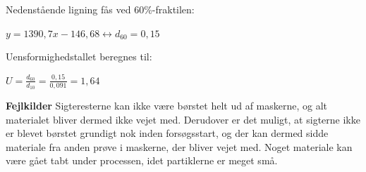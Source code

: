 Nedenstående ligning fås ved 60\%-fraktilen:
\begin{center}
	$y = 1390,\!7x - 146,\!68 \leftrightarrow d_{60}=0,\!15$
\end{center}

Uensformighedstallet beregnes til:
\begin{center}
	$U=\frac{d_{60}}{d_{10}} = \frac{0,\!15}{0,\!091} = 1,\!64$
\end{center}

\textbf{Fejlkilder}
\newline
Sigteresterne kan ikke være børstet helt ud af maskerne, og alt materialet bliver dermed ikke vejet med. Derudover er det muligt, at sigterne ikke er blevet børstet grundigt nok inden forsøgsstart, og der kan dermed sidde materiale fra anden prøve i maskerne, der bliver vejet med.
\newline
Noget materiale kan være gået tabt under processen, idet partiklerne er meget små. 